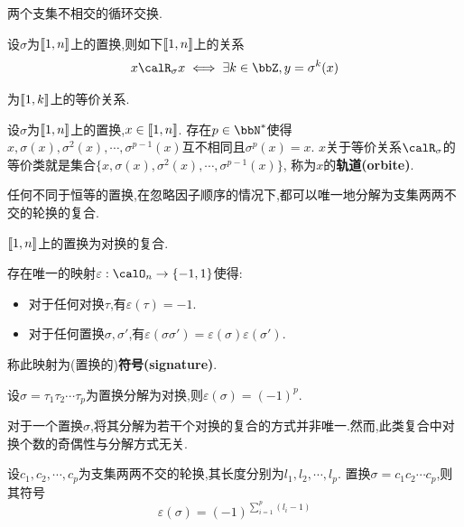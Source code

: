 \begin{prop}
    两个支集不相交的循环交换.
\end{prop}

\begin{prop}
    设$\sigma$为$\llbracket 1, n \rrbracket$上的置换,则如下$\llbracket 1, n \rrbracket$上的关系
    \[ x \calR_{\sigma} x \iff \exists k \in \bbZ, y = \sigma^k(x) \]

    为$\llbracket 1, k \rrbracket$上的等价关系.
\end{prop}

\begin{prop}
    设$\sigma$为$\llbracket 1, n \rrbracket$上的置换,$x \in \llbracket 1, n \rrbracket$.
    存在$p \in \bbN^*$使得$x, \sigma(x), \sigma^2(x), \cdots, \sigma^{p - 1}(x)$互不相同且$\sigma^p(x) = x$.
    $x$关于等价关系$\calR_{\sigma}$的等价类就是集合$\{ x, \sigma(x), \sigma^2(x), \cdots, \sigma^{p - 1}(x) \}$,
    称为$x$的\textbf{轨道(orbite)}.
\end{prop}

\begin{thm}
    任何不同于恒等的置换,在忽略因子顺序的情况下,都可以唯一地分解为支集两两不交的轮换的复合.
\end{thm}

\begin{prop}
    $\llbracket 1, n \rrbracket$上的置换为对换的复合.
\end{prop}

\begin{thm}
    存在唯一的映射$\varepsilon: \calO_n \to \{ -1, 1 \}$使得:
    \begin{itemize}
        \item 对于任何对换$\tau$,有$\varepsilon(\tau) = -1$.
        \item 对于任何置换$\sigma, \sigma'$,有$\varepsilon(\sigma \sigma') = \varepsilon(\sigma) \varepsilon(\sigma')$.
    \end{itemize}

    称此映射为(置换的)\textbf{符号(signature)}.
\end{thm}

\begin{cor}
    设$\sigma = \tau_1 \tau_2 \cdots \tau_p$为置换分解为对换,则$\varepsilon(\sigma) = (-1)^p$.
\end{cor}

\begin{rqq}
    对于一个置换$\sigma$,将其分解为若干个对换的复合的方式并非唯一.然而,此类复合中对换个数的奇偶性与分解方式无关.
\end{rqq}

\begin{cor}
    设$c_1, c_2, \cdots, c_p$为支集两两不交的轮换,其长度分别为$l_1, l_2, \cdots, l_p$.
    置换$\sigma = c_1c_2 \cdots c_p$,则其符号\[ \varepsilon(\sigma) = (-1)^{\sum\limits_{i = 1}^p (l_i - 1)} \]
\end{cor}